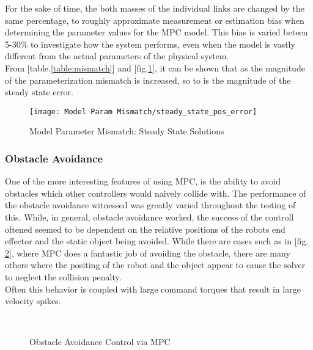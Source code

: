 \documentclass[journal]{IEEEtran}
\begin{document}
For the sake of time, the both masses of the individual links are changed by the same percentage, to roughly approximate measurement or estimation bias when determining the parameter values for the MPC model. This bias is varied beteen 5-30\% to investigate how the system performs, even when the model is vastly different from the actual parameters of the physical system. \\

From [table.\ref{table:mismatch}] and [fig.\ref{fig:model_param_mismatch}], it can be shown that as the magnitude of the parameterization mismatch is increased, so to is the magnitude of the steady state error.

\begin{figure}[ht]%
    \centering
    \texttt{[image: Model Param Mismatch/steady\_state\_pos\_error]}
    \caption{Model Parameter Mismatch: Steady State Solutions}%
    \label{fig:model_param_mismatch}%
\end{figure}

\subsubsection{Obstacle Avoidance}

One of the more interesting features of using MPC, is the ability to avoid obstacles which other controllers would naively collide with. The performance of the obstacle avoidance witnessed was greatly varied throughout the testing of this. While, in general, obstacle avoidance worked, the success of the controll oftened seemed to be dependent on the relative positions of the robots end effector and the static object being avoided. While there are cases such as in [fig. \ref{fig:obs_avoid_control_action}], where MPC does a fantastic job of avoiding the obstacle, there are many others where the positing of the robot and the object appear to cause the solver to neglect the collision penalty. \\

Often this behavior is coupled with large command torques that result in large velocity spikes.

\begin{figure}[ht]%
    \centering
    \qquad
    \\
    \caption{Obstacle Avoidance Control via MPC}%
    \label{fig:obs_avoid_control_action}%
\end{figure}
\end{document}
